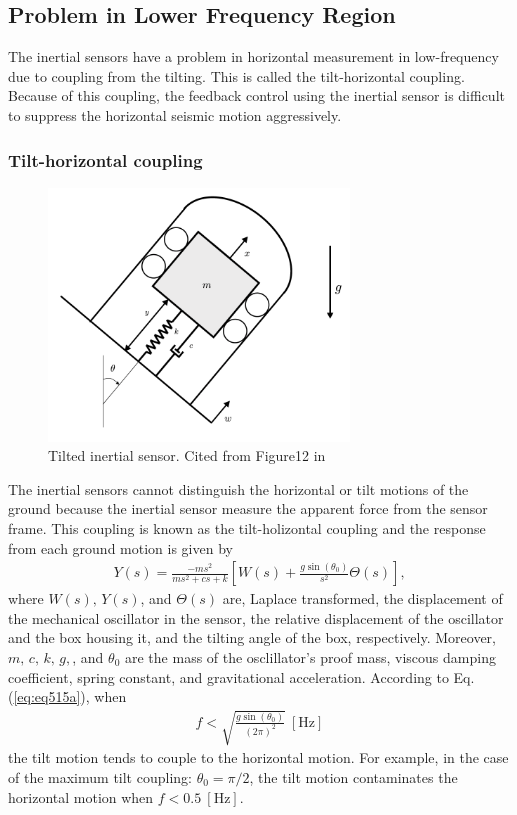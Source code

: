 \subsection{Problem in Lower Frequency Region}
The inertial sensors have a problem in horizontal measurement in low-frequency due to coupling from the tilting. This is called the tilt-horizontal coupling. Because of this coupling, the feedback control using the inertial sensor is difficult to suppress the horizontal seismic motion aggressively.

\subsubsection{Tilt-horizontal coupling}
\begin{figure}[h]
  \begin{center}   
    \includegraphics[width=8cm]{./img_chap5/img509.png}
    \caption{Tilted inertial sensor. Cited from Figure12 in \cite{collette2012inertial}} \label{img:img509}
  \end{center}
\end{figure}
 The inertial sensors cannot distinguish the horizontal or tilt motions of the ground because the inertial sensor measure the apparent force from the sensor frame. This coupling is known as the tilt-holizontal coupling and the response from each ground motion is given by \cite{collette2012inertial}
\begin{eqnarray}
  Y(s)=\frac{-m s^{2}}{m s^{2}+c s+k} \left[ W(s) + \frac{g \sin \left(\theta_{0}\right)}{s^2} \Theta(s) \right] \label{eq:eq515a},
\end{eqnarray}
where $W(s),\,Y(s)$, and $\Theta(s)$ are, Laplace transformed, the displacement of the mechanical oscillator in the sensor, the relative displacement of the oscillator and the box housing it, and the tilting angle of the box, respectively. Moreover, $m,\,c,\,k,\,g,$, and $\theta_0$ are the mass of the osclillator's proof mass, viscous damping coefficient, spring constant, and gravitational acceleration. According to Eq.(\ref{eq:eq515a}), when 
\begin{eqnarray}
  f < \sqrt{\frac{g\sin(\theta_0)}{(2\pi)^2}}\ [\mathrm{Hz}]
  \label{eq:eq515}
\end{eqnarray}
the tilt motion tends to couple to the horizontal motion. For example, in the case of the maximum tilt coupling: $\theta_0=\pi/2$, the tilt motion contaminates the horizontal motion when $f<0.5\ [\mathrm{Hz}]$.


